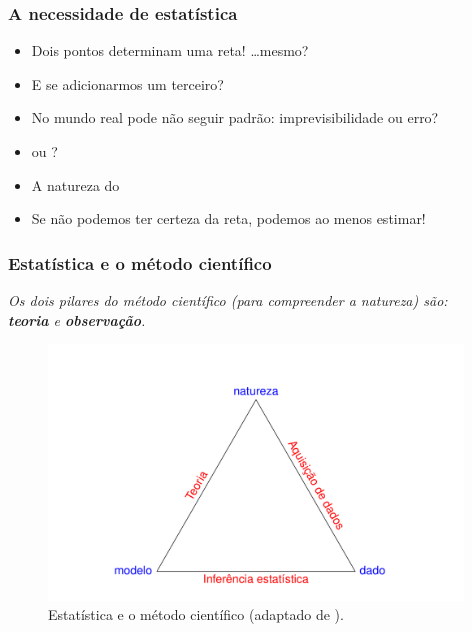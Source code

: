 \documentclass[handout,serif, professionalfont, usenames, dvipsnames, aspectratio = 169]{beamer}\usepackage[]{graphicx}\usepackage[]{color}
\newenvironment{knitrout}{}{} %
\begin{document}
\begin{frame}
\frametitle{A necessidade de estatística}

\begin{itemize}
\item Dois pontos determinam uma reta! \ldots mesmo?
\item E se adicionarmos um terceiro? 
\item No mundo real pode não seguir padrão: imprevisibilidade ou erro?
\item {} ou ? 
\item A natureza do 
\item Se não podemos  ter certeza da reta, podemos ao menos estimar!
\end{itemize}

\end{frame}

\begin{frame}[fragile]
\frametitle{Estatística e o método científico}

\textit{Os dois pilares do método científico (para compreender a natureza) são:\\ {\bf teoria} e {\bf observação}.}
\vspace{-1cm}
\begin{knitrout}
\color{fgcolor}\begin{figure}

{\centering \includegraphics[width=11cm,height=0.75\textheight]{figure/unnamed-chunk-2-1} 

}

\caption{Estatística e o método científico (adaptado de \cite{diggle+chetwynd:2011}).}\label{fig:unnamed-chunk-2}
\end{figure}


\end{knitrout}
\end{frame}
\end{document}
